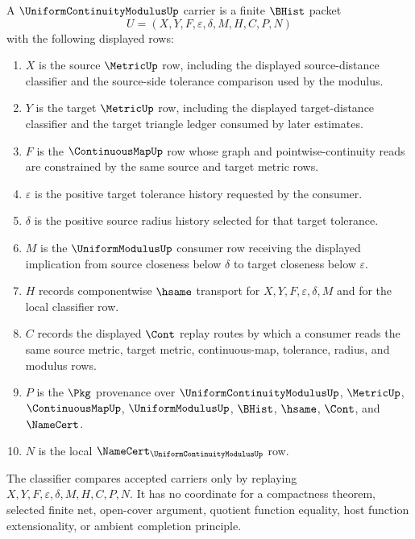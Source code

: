 \begin{definition}
\label{def:uniform-continuity-modulus-carrier}
A $\UniformContinuityModulusUp$ carrier is a finite $\BHist$ packet
$$
U=(X,Y,F,\varepsilon,\delta,M,H,C,P,N)
$$
with the following displayed rows:
\begin{enumerate}
\item $X$ is the source $\MetricUp$ row, including the displayed source-distance classifier and the source-side tolerance comparison used by the modulus.
\item $Y$ is the target $\MetricUp$ row, including the displayed target-distance classifier and the target triangle ledger consumed by later estimates.
\item $F$ is the $\ContinuousMapUp$ row whose graph and pointwise-continuity reads are constrained by the same source and target metric rows.
\item $\varepsilon$ is the positive target tolerance history requested by the consumer.
\item $\delta$ is the positive source radius history selected for that target tolerance.
\item $M$ is the $\UniformModulusUp$ consumer row receiving the displayed implication from source closeness below $\delta$ to target closeness below $\varepsilon$.
\item $H$ records componentwise $\hsame$ transport for $X,Y,F,\varepsilon,\delta,M$ and for the local classifier row.
\item $C$ records the displayed $\Cont$ replay routes by which a consumer reads the same source metric, target metric, continuous-map, tolerance, radius, and modulus rows.
\item $P$ is the $\Pkg$ provenance over $\UniformContinuityModulusUp$, $\MetricUp$, $\ContinuousMapUp$, $\UniformModulusUp$, $\BHist$, $\hsame$, $\Cont$, and $\NameCert$.
\item $N$ is the local $\NameCert_{\UniformContinuityModulusUp}$ row.
\end{enumerate}
The classifier compares accepted carriers only by replaying $X,Y,F,\varepsilon,\delta,M,H,C,P,N$. It has no coordinate for a compactness theorem, selected finite net, open-cover argument, quotient function equality, host function extensionality, or ambient completion principle.
\end{definition}

